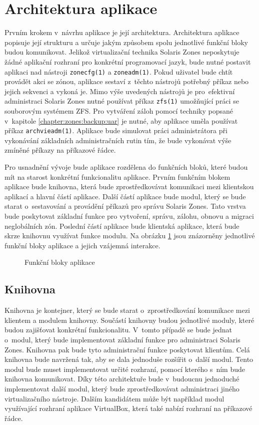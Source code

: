 \section{Architektura aplikace}
\label{chapter:design:architecture}
Prvním krokem v~návrhu aplikace je její architektura. Architektura aplikace popisuje její strukturu a určuje jakým způsobem
spolu jednotlivé funkční bloky budou komunikovat. Jelikož virtualizační technika Solaris Zones neposkytuje žádné aplikační rozhraní pro konkrétní
programovací jazyk, bude nutné postavit aplikaci nad nástroji \verb|zonecfg(1)| a \verb|zoneadm(1)|. Pokud uživatel bude chtít
provádět akci se zónou, aplikace sestaví z~těchto nástrojů potřebný příkaz nebo jejich sekvenci a vykoná je. Mimo výše
uvedených nástrojů je pro~efektivní administraci Solaris Zones nutné používat příkaz \verb|zfs(1)| umožňující práci se souborovým
systémem ZFS. Pro vytváření záloh pomocí techniky popsané v~kapitole \ref{chapter:zones:backup:uar} je nutné, aby aplikace uměla
používat příkaz \verb|archvieadm(1)|. Aplikace bude simulovat práci administrátora při vykonávání základních administračních
rutin tím, že bude vykonávat výše zmíněné příkazy na příkazové řádce.

Pro usnadnění vývoje bude aplikace rozdělena do funkčních bloků, které budou mít na starost konkrétní funkcionalitu aplikace. Prvním
funkčním blokem aplikace bude knihovna, která bude zprostředkovávat komunikaci mezi klientskou aplikací a hlavní částí aplikace.
Další částí aplikace bude modul, který se bude starat o~sestavování a provádění příkazů pro správu Solaris Zones.
Tato vrstva bude poskytovat základní funkce pro vytvoření, správu, zálohu, obnovu a migraci neglobálních zón. Poslední částí aplikace
bude klientská aplikace, která bude skrze knihovnu využívat funkce modulu. Na obrázku \ref{image:architecture} jsou znázorněny 
jednotlivé funkční bloky aplikace a jejich vzájemná interakce.
\begin{figure}
    \centering    
    \caption{Funkční bloky aplikace}
    \label{image:architecture}
\end{figure}
\subsection{Knihovna}
\label{chapter:design:architecture:library}
Knihovna je kontejner, který se bude starat o~zprostředkování komunikace mezi klientem a modulem knihovny. Součástí
knihovny budou jednotlivé moduly, které budou zajišťovat konkrétní funkcionalitu. V~tomto případě se bude jednat o~modul, který
bude implementovat základní funkce pro administraci Solaris Zones. Knihovna pak bude tyto administrační funkce poskytovat klientům.
Celá knihovna bude navržená tak, aby se dala jednoduše rozšířit o~další modul. Tento modul bude muset implementovat určité
rozhraní, pomocí kterého s~ním bude knihovna komunikovat. Díky této architektuře bude v~budoucnu jednoduché implementovat
další modul, který bude zprostředkovávat administraci jiného virtualizačního nástroje. Dalším kandidátem může být například
modul využívající rozhraní aplikace VirtualBox, která také nabízí rozhraní na příkazové řádce.

